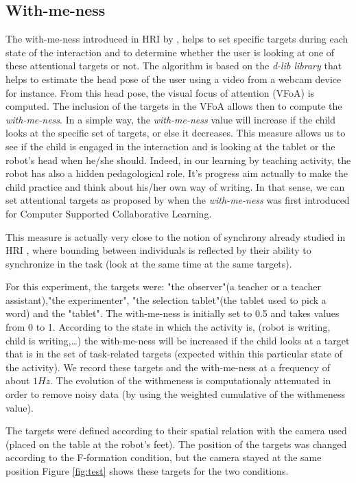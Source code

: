 \documentclass[letterpaper, 10 pt, conference]{ieeeconf}  %
\begin{document}
\subsection{With-me-ness}
The with-me-ness introduced in HRI by \cite{lemaignan2016realtime}, helps to set specific targets during each state of the interaction and to determine whether the user is looking at one of these attentional targets or not.
The algorithm is based on the \textit{d-lib library} that helps to estimate the head pose of the user using a video from a webcam device for instance.
From this head pose, the visual focus of attention (VFoA) is computed.
The inclusion of the targets in the VFoA allows then to compute the \emph{with-me-ness}.
In a simple way, the \emph{with-me-ness} value will increase if the child looks at the specific set of targets, or else it decreases.
This measure allows us to see if the child is engaged in the interaction and is looking at the tablet or the robot's head when he/she should.
Indeed, in our learning by teaching activity, the robot has also a hidden pedagological role. It's progress aim actually to make the child practice and think about his/her own way of writing. 
In that sense, we can set attentional targets as proposed by \cite{sharma2014me} when the \emph{with-me-ness} was first introduced for Computer Supported Collaborative Learning.

This measure is actually very close to the notion of synchrony already studied in HRI \cite{delaherche2012interpersonal}, where bounding between individuals is reflected by their ability to synchronize in the task (look at the same time at the same targets).

For this experiment, the targets were: "the observer"(a teacher or a teacher assistant),"the experimenter",  "the selection tablet"(the tablet used to pick a word) and the "tablet".
The with-me-ness is initially set to 0.5 and takes values from 0 to 1.
According to the state in which the activity is, (robot is writing, child is writing,\dots) the with-me-ness will be increased if the child looks at a target that is in the set of task-related targets (expected within this particular state of the activity).
We record these targets and the with-me-ness at a frequency of about $1Hz$.
The evolution of the withmeness is computationaly attenuated in order to remove noisy data (by using the weighted cumulative of the withmeness value).


The targets were defined according to their spatial relation with the camera used (placed on the table at the robot's feet).
The position of the targets was changed according to the F-formation condition, but the camera stayed at the same position
Figure \ref{fig:test} shows these targets for the two conditions.
\end{document}
